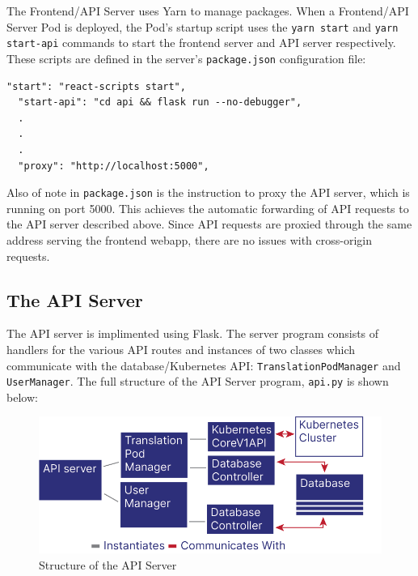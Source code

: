 \documentclass[12pt]{article}
\begin{document}
The Frontend/API Server uses Yarn \cite{yarn} to manage packages.
When a Frontend/API Server Pod is deployed, the Pod's startup script
uses the \lstinline{yarn start} and \lstinline{yarn start-api}
commands to start the frontend server and API server respectively.
These scripts are defined in the server's \lstinline{package.json}
configuration file:

\begin{lstlisting}[basicstyle=\linespread{0.5}\ttfamily,caption={Frontend/API Server Configuration},captionpos=b]
  "start": "react-scripts start",
  "start-api": "cd api && flask run --no-debugger",
  .
  .
  .
  "proxy": "http://localhost:5000",
\end{lstlisting}

Also of note in \lstinline{package.json} is the instruction to proxy
the API server, which is running on port 5000.  This achieves the
automatic forwarding of API requests to the API server described
above.  Since API requests are proxied through the same address
serving the frontend webapp, there are no issues with cross-origin
requests.

\subsection{The API Server}

The API server is implimented using Flask.  The server program
consists of handlers for the various API routes and instances of two
classes which communicate with the database/Kubernetes API:
\lstinline{TranslationPodManager} and \lstinline{UserManager}.  The
full structure of the API Server program, \lstinline{api.py} is shown
below:

\begin{figure}[h!]

  \includegraphics[scale=1]{api_structure}
  \centering
  \caption{Structure of the API Server}
  \label{rr:detailed}
\end{figure}
\end{document}
